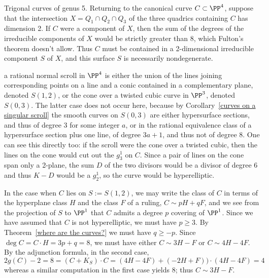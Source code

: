 

\begin{exercise} Trigonal curves of genus 5.\label{trigonal genus 5} 
 Returning to the canonical curve $C \subset \PP^4$, suppose that the intersection $X = Q_1 \cap Q_2 \cap Q_3$ of the three quadrics containing $C$ has dimension 2. If $C$ were a component of $X$, then the sum of the degrees of the irreducible components of $X$ would be strictly greater than 8, which Fulton's theorem doesn't allow. Thus $C$ must be contained in a 2-dimensional irreducible component  $S$ of $X$, and this surface $S$ is necessarily nondegenerate. 

 a rational normal scroll in $\PP^4$ is either
 the union of the lines joining corresponding points on a line and a conic contained in a complementary plane, denoted $S(1,2)$, or the cone over a twisted cubic curve in $\PP^3$, denoted $S(0,3)$. The latter case does not occur here, because by Corollary~\ref{curves on a singular scroll} the smooth curves on $S(0,3)$ are either hypersurface sections, and thus of degree $3$ for
some integer $a$, or in the rational equivalence class of a hypersurface section plus one line,
of degree $3a+1$, and thus not of degree 8. One can see this directly too: if the scroll were the cone over
a twisted cubic, then the lines on the cone would cut out the $g^1_3$ on $C$. Since a pair of lines on the cone span
only a 2-plane, the sum $D$ of the two divisors would be a divisor of degree 6  and thus $K-D$ would be a $g^1_2$, 
so the curve would be hyperelliptic.

In the case when $C$ lies on $S := S(1,2)$, we may write the class of $C$ in terms of the hyperplane class $H$ and the class $F$ of a ruling, $C\sim pH+qF$, and we see from the 
projection of $S$ to $\PP^1$ that $C$ admits
a degree $p$ covering of $\PP^1$. Since we have assumed that $C$ is not hyperelliptic,
we must have $p\geq 3$. By Theorem~\ref{where are the curves?} we must have
$q\geq -p$. Since $\deg C = C\cdot H = 3p+q = 8$, we must have either 
$C\sim 3H-F$ or $C\sim 4H-4F$. By the adjunction formula, in the second case,
$$
2g(C)-2 = 8 = (C+K_S)\cdot C = (4H-4F)+(-2H+F))\cdot(4H-4F) =4
$$
whereas a similar computation in the first case yields 8; thus $C\sim 3H-F$.


\end{exercise}
